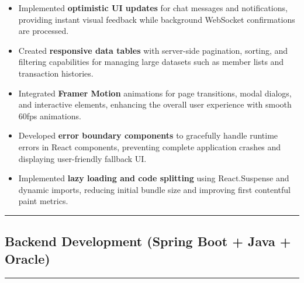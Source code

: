 \documentclass[
  12pt,
  a4paperpaper,
]{report}
\begin{document}
\begin{itemize}
  Built \textbf{protected route guards} that intercept navigation
  attempts, verifying JWT validity and role permissions before granting
  access to role-restricted pages.
\item
  Implemented \textbf{optimistic UI updates} for chat messages and
  notifications, providing instant visual feedback while background
  WebSocket confirmations are processed.
\item
  Created \textbf{responsive data tables} with server-side pagination,
  sorting, and filtering capabilities for managing large datasets such as
  member lists and transaction histories.
\item
  Integrated \textbf{Framer Motion} animations for page transitions,
  modal dialogs, and interactive elements, enhancing the overall user
  experience with smooth 60fps animations.
\item
  Developed \textbf{error boundary components} to gracefully handle
  runtime errors in React components, preventing complete application
  crashes and displaying user-friendly fallback UI.
\item
  Implemented \textbf{lazy loading and code splitting} using React.Suspense
  and dynamic imports, reducing initial bundle size and improving first
  contentful paint metrics.
\end{itemize}

\medskip\noindent

\rule{\textwidth}{0.3pt}

\subsection{Backend Development (Spring Boot + Java +
Oracle)}\label{backend-development-spring-boot-java-oracle}

\noindent

\rule{\textwidth}{0.3pt}\medskip
\end{document}
